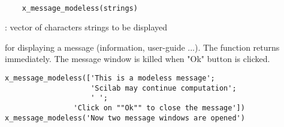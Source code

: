 
\begin{mandesc}
  \\ %
\end{mandesc}
\label{x-message-modeless}
\begin{calling_sequence}
  \begin{verbatim}
    x_message_modeless(strings)   
  \end{verbatim}
\end{calling_sequence}
\begin{parameters}
  \begin{varlist}
    : vector of characters strings to be displayed
  \end{varlist}
\end{parameters}
\begin{mandescription}
  for displaying a message (information, user-guide ...). The function
  returns immediately. The message window is killed when "Ok" button is
  clicked.
\end{mandescription}
\begin{examples}
\begin{Verbatim}
x_message_modeless(['This is a modeless message';
                    'Scilab may continue computation';
                    ' ';
	            'Click on ""Ok"" to close the message'])
x_message_modeless('Now two message windows are opened')
\end{Verbatim}
\end{examples}
\begin{manseealso}
      
\end{manseealso}

